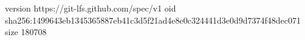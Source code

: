 version https://git-lfs.github.com/spec/v1
oid sha256:1499643eb1345365887eb41c3d5f21ad4e8e0c324441d3e0d9d7374f48dec071
size 180708
